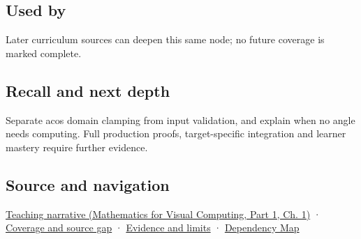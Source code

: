 \subsection{Used by}\label{appendix-e569e60e18e6-used-by}

\hypertarget{appendix-e569e60e18e6-used-by}{}

Later curriculum sources can deepen this same node; no future coverage is marked complete.

\subsection{Recall and next depth}\label{appendix-e569e60e18e6-recall-and-next-depth}

\hypertarget{appendix-e569e60e18e6-recall-and-next-depth}{}

Separate acos domain clamping from input validation, and explain when no angle needs computing. Full production proofs, target-specific integration and learner mastery require further evidence.

\subsection{Source and navigation}\label{appendix-e569e60e18e6-source-and-navigation}

\hypertarget{appendix-e569e60e18e6-source-and-navigation}{}

\href{../02-Mathematics-for-Visual-Computing-P01/main.pdf\#nameddest=01-foundations-i-ch017-an-angle-is-a-question-with-a-domain}{Teaching narrative (Mathematics for Visual Computing, Part 1, Ch. 1)} · \hyperref[appendix-fd090d982a15-phase-6---parts-501-600]{Coverage and source gap} · \hyperref[appendix-a103e7846d21-phase-6---source-analysis-and-verification]{Evidence and limits} · \hyperref[appendix-4ad47bdd269a]{Dependency Map}
